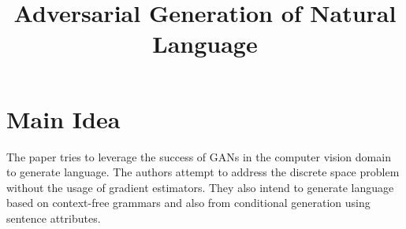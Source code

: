 \documentclass[12pt]{scrartcl}
\begin{document}
\title{Adversarial Generation of Natural Language}
\author{}
\date{}
\maketitle

\section{Main Idea}
The paper tries to leverage the success of GANs in the computer vision domain to generate language. The authors attempt to address the discrete space problem without the usage of gradient estimators. They also intend to generate language based on context-free grammars and also from conditional generation using sentence attributes. \cite{subramanian2017adversarial}
\end{document}
